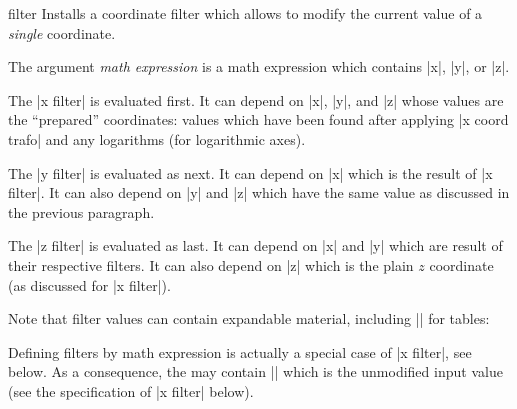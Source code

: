 \begin{pgfplotsxyexpressionkeylist}{\x\space filter}
    Installs a coordinate filter which allows to modify the current value of a
    \emph{single} coordinate.

    The argument \emph{math expression} is a math expression which contains
    |x|, |y|, or |z|.
\begin{codeexample}[]
\end{codeexample}

    The |x filter| is evaluated first. It can depend on |x|, |y|, and |z| whose
    values are the ``prepared'' coordinates: values which have been found after
    applying |x coord trafo| and any logarithms (for logarithmic axes).

    The |y filter| is evaluated as next. It can depend on |x| which is the
    result of |x filter|. It can also depend on |y| and |z| which have the same
    value as discussed in the previous paragraph.

    The |z filter| is evaluated as last. It can depend on |x| and |y| which are
    result of their respective filters. It can also depend on |z| which is the
    plain $z$ coordinate (as discussed for |x filter|).

    Note that filter values can contain expandable material, including
    |\thisrow| for tables:
\begin{codeexample}[]
\end{codeexample}
    Defining filters by math expression is actually a special case of
    |x filter|, see below. As a consequence, the  may contain
    |\pgfmathresult| which is the unmodified input value (see the specification
    of |x filter| below).
\end{pgfplotsxyexpressionkeylist}

